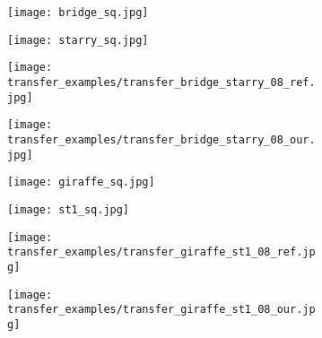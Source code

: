 \begin{figure}[H]
	\centering
	\begin{subfigure}[b]{0.225\linewidth}
		\texttt{[image: bridge\_sq.jpg]} %
	\end{subfigure}
	\begin{subfigure}[b]{0.225\linewidth}
		\texttt{[image: starry\_sq.jpg]} %
	\end{subfigure}
	\begin{subfigure}[b]{0.225\linewidth}
		\texttt{[image: transfer\_examples/transfer\_bridge\_starry\_08\_ref.jpg]} %
	\end{subfigure}
	\begin{subfigure}[b]{0.225\linewidth}
		\texttt{[image: transfer\_examples/transfer\_bridge\_starry\_08\_our.jpg]} %
	\end{subfigure}
	\centering
	\begin{subfigure}[b]{0.225\linewidth}
		\texttt{[image: giraffe\_sq.jpg]} %
	\end{subfigure}
	\begin{subfigure}[b]{0.225\linewidth}
		\texttt{[image: st1\_sq.jpg]} %
	\end{subfigure}
	\begin{subfigure}[b]{0.225\linewidth}
		\texttt{[image: transfer\_examples/transfer\_giraffe\_st1\_08\_ref.jpg]} %
	\end{subfigure}
	\begin{subfigure}[b]{0.225\linewidth}
		\texttt{[image: transfer\_examples/transfer\_giraffe\_st1\_08\_our.jpg]} %
	\end{subfigure}

\end{figure}
